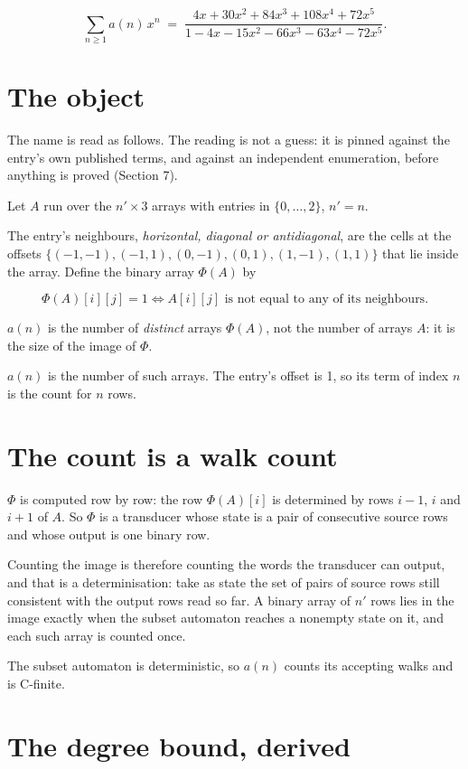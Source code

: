 \documentclass[11pt]{article}
\theoremstyle{definition}
\begin{document}
\[\sum_{n \ge 1} a(n)\,x^n \;=\; \frac{4x + 30x^{2} + 84x^{3} + 108x^{4} + 72x^{5}}{1 - 4x - 15x^{2} - 66x^{3} - 63x^{4} - 72x^{5}}.\]

\section{The object}

The name is read as follows. The reading is not a guess: it is pinned against the entry's own published terms, and against an independent enumeration, before anything is proved (Section 7).

Let $A$ run over the $n' \times 3$ arrays with entries in $\{0,\dots,2\}$, $n' = n$.

The entry's neighbours, {\itshape horizontal, diagonal or antidiagonal}, are the cells at the offsets $\{(-1,-1), (-1,1), (0,-1), (0,1), (1,-1), (1,1)\}$ that lie inside the array. Define the binary array $\Phi(A)$ by

\[\Phi(A)[i][j] = 1 \iff A[i][j] \text{ is not equal to any of its neighbours}.\]

$a(n)$ is the number of {\itshape distinct} arrays $\Phi(A)$, not the number of arrays $A$: it is the size of the image of $\Phi$.

$a(n)$ is the number of such arrays. The entry's offset is 1, so its term of index $n$ is the count for $n$ rows.

\section{The count is a walk count}

$\Phi$ is computed row by row: the row $\Phi(A)[i]$ is determined by rows $i-1$, $i$ and $i+1$ of $A$. So $\Phi$ is a transducer whose state is a pair of consecutive source rows and whose output is one binary row.

Counting the image is therefore counting the words the transducer can output, and that is a determinisation: take as state the set of pairs of source rows still consistent with the output rows read so far. A binary array of $n'$ rows lies in the image exactly when the subset automaton reaches a nonempty state on it, and each such array is counted once.

The subset automaton is deterministic, so $a(n)$ counts its accepting walks and is C-finite.

\section{The degree bound, derived}
\end{document}
